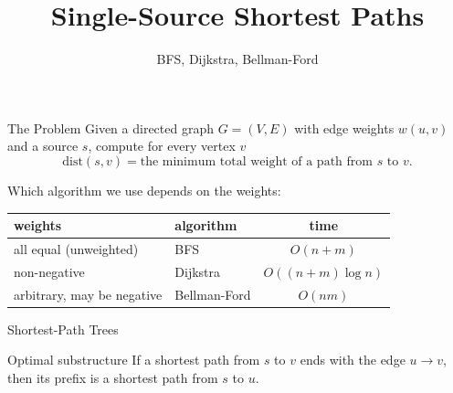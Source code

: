 \documentclass[10pt,aspectratio=169]{beamer}
\title{Single-Source Shortest Paths}
\subtitle{BFS, Dijkstra, Bellman-Ford}
\date{}
\author{}
\begin{document}
\maketitle

\begin{frame}{The Problem}
  Given a directed graph $G = (V, E)$ with edge weights $w(u, v)$ and a
  \alert{source} $s$, compute for every vertex $v$
  \[
    \text{dist}(s, v) = \text{the minimum total weight of a path from } s
    \text{ to } v.
  \]

  \pause
  \bigskip
  Which algorithm we use depends on the weights:

  \bigskip
  \begin{center}
  \begin{tabular}{llc}
    \toprule
    weights & algorithm & time \\
    \midrule
    all equal (unweighted) & BFS & $O(n + m)$ \\
    non-negative           & Dijkstra & $O((n + m) \log n)$ \\
    arbitrary, may be negative & Bellman-Ford & $O(nm)$ \\
    \bottomrule
  \end{tabular}
  \end{center}
\end{frame}

\begin{frame}{Shortest-Path Trees}
  \begin{block}{Optimal substructure}
    If a shortest path from $s$ to $v$ ends with the edge $u \to v$, then its
    prefix is a shortest path from $s$ to $u$.
  \end{block}

  \bigskip
  \begin{center}
  \end{center}

  \bigskip
\end{frame}
\end{document}
